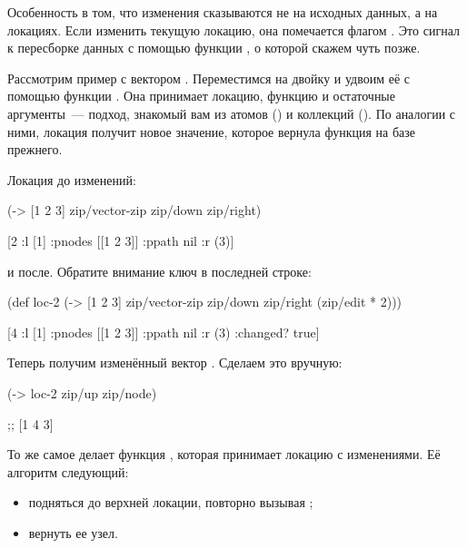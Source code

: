 Особенность в том, что изменения сказываются не на исходных данных, а на
локациях. Если изменить текущую локацию, она помечается флагом . Это
сигнал к пересборке данных с помощью функции , о которой скажем чуть
позже.

Рассмотрим пример с вектором \code{[1 2 3]}. Переместимся на двойку и удвоим её с
помощью функции . Она принимает локацию, функцию и остаточные
аргументы~--- подход, знакомый вам из атомов () и коллекций (). По
аналогии с ними, локация получит новое значение, которое вернула функция на базе
прежнего.

Локация до изменений:

\begin{english}
  \begin{clojure}
(-> [1 2 3]
    zip/vector-zip
    zip/down
    zip/right)

[2 {:l [1] :pnodes [[1 2 3]] :ppath nil :r (3)}]
  \end{clojure}
\end{english}

\noindent
и после. Обратите внимание ключ  в последней строке:

\begin{english}
  \begin{clojure}
(def loc-2
  (-> [1 2 3]
      zip/vector-zip
      zip/down
      zip/right
      (zip/edit * 2)))

[4 {:l [1] :pnodes [[1 2 3]] :ppath nil :r (3)
    :changed? true}]
  \end{clojure}
\end{english}

Теперь получим изменённый вектор \code{[1 4 3]}. Сделаем это вручную:

\begin{english}
  \begin{clojure}
(-> loc-2
    zip/up
    zip/node)

;; [1 4 3]
  \end{clojure}
\end{english}

То же самое делает функция , которая принимает локацию с
изменениями. Её алгоритм следующий:

\begin{itemize}

\item
  подняться до верхней локации, повторно вызывая ;

\item
  вернуть ее узел.

\end{itemize}

